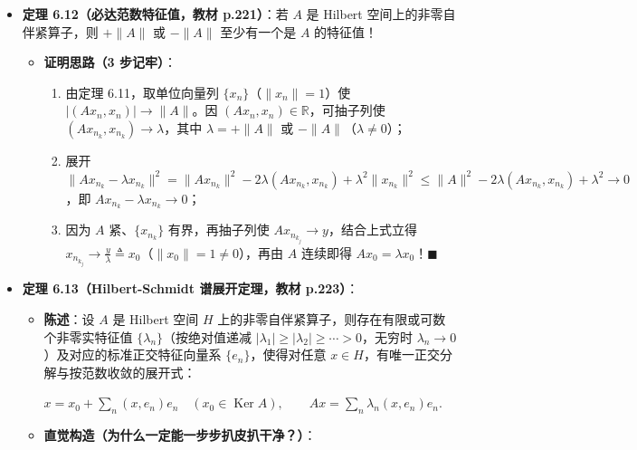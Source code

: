 \documentclass[11pt,a4paper]{article}
\providecommand{\tightlist}{\setlength{\itemsep}{2pt}\setlength{\parskip}{0pt}}
\newcommand{\FitDisplayMath}[1]{%
  \par\vspace{4.5pt}\noindent
  \begin{adjustbox}{max width=\linewidth, center}
    $\displaystyle #1$
  \end{adjustbox}
  \par\vspace{4.5pt}%
}
\begin{document}
\begin{itemize}
\tightlist
\item
  \textbf{定理 6.12（必达范数特征值，教材 p.221）}：若 \(A\) 是 Hilbert 空间上的非零自伴紧算子，则 \(+\lVert A\rVert\) 或 \(-\lVert A\rVert\) 至少有一个是 \(A\) 的特征值！

  \begin{itemize}
  \tightlist
  \item
    \textbf{证明思路（3 步记牢）}：

    \begin{enumerate}
    \def\labelenumi{\arabic{enumi}.}
    \tightlist
    \item
      由定理 6.11，取单位向量列 \(\{x_n\}\)（\(\lVert x_n\rVert = 1\)）使 \(\lvert(Ax_n, x_n)\rvert \to \lVert A\rVert\)。因 \((Ax_n, x_n) \in \mathbb{R}\)，可抽子列使 \((Ax_{n_k}, x_{n_k}) \to \lambda\)，其中 \(\lambda = +\lVert A\rVert\) 或 \(-\lVert A\rVert\)（\(\lambda \neq 0\)）；
    \item
      展开 \(\lVert Ax_{n_k} - \lambda x_{n_k}\rVert^2 = \lVert Ax_{n_k}\rVert^2 - 2\lambda(Ax_{n_k}, x_{n_k}) + \lambda^2\lVert x_{n_k}\rVert^2 \le \lVert A\rVert^2 - 2\lambda(Ax_{n_k}, x_{n_k}) + \lambda^2 \to 0\)，即 \textbf{\(Ax_{n_k} - \lambda x_{n_k} \to 0\)}；
    \item
      因为 \(A\) 紧、\(\{x_{n_k}\}\) 有界，再抽子列使 \(Ax_{n_{k_j}} \to y\)，结合上式立得 \(x_{n_{k_j}} \to \frac{y}{\lambda} \triangleq x_0\)（\(\lVert x_0\rVert = 1 \neq 0\)），再由 \(A\) 连续即得 \(Ax_0 = \lambda x_0\)！\(\blacksquare\)
    \end{enumerate}
  \end{itemize}
\item
  \textbf{定理 6.13（Hilbert-Schmidt 谱展开定理，教材 p.223）}：

  \begin{itemize}
  \tightlist
  \item
    \textbf{陈述}：设 \(A\) 是 Hilbert 空间 \(H\) 上的非零自伴紧算子，则存在有限或可数个非零实特征值 \(\{\lambda_n\}\)（按绝对值递减 \(\lvert\lambda_1\rvert \ge \lvert\lambda_2\rvert \ge \cdots > 0\)，无穷时 \(\lambda_n \to 0\)）及对应的标准正交特征向量系 \(\{e_n\}\)，使得对任意 \(x \in H\)，有唯一正交分解与按范数收敛的展开式： 
\FitDisplayMath{x = x_0 + \sum_{n} (x, e_n)e_n \quad (x_0 \in \operatorname{Ker}A), \qquad Ax = \sum_{n} \lambda_n (x, e_n)e_n.}

  \item
    \textbf{直觉构造（为什么一定能一步步扒皮扒干净？）}：


\end{itemize}
\end{itemize}
\end{document}
